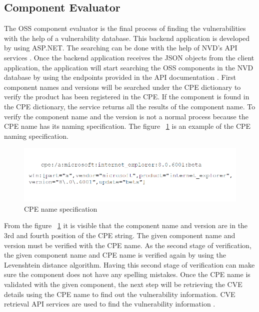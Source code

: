 \subsection{Component Evaluator}
The \acs{OSS} component evaluator is the final process of finding the vulnerabilities with the help of a vulnerability database. This backend application is developed by using ASP.NET. The searching can be done with the help of \acs{NVD}'s API services \cite{NVDApi}. Once the backend application receives the JSON objects from the client application, the application will start searching the OSS components in the \acs{NVD} database by using the endpoints provided in the API documentation \cite{NVDApi}. First component names and versions will be searched under the \acs{CPE} dictionary to verify the product has been registered in the \acs{CPE}. If the component is found in the \acs{CPE} dictionary, the service returns all the results of the component name. To verify the component name and the version is not a normal process because the \acs{CPE} name has its naming specification. The figure ~\ref{fig:cpe_name} is an example of the \acs{CPE} naming specification.
 \begin{figure}[h!]
	\includegraphics[width=16cm]{includes/cpe_name.png}
	\centering
	\caption{CPE name specification}
	\label{fig:cpe_name}
\end{figure}
From the figure ~\ref{fig:cpe_name} it is visible that the component name and version are in the 3rd and fourth position of the \acs{CPE} string. The given component name and version must be verified with the \acs{CPE} name. As the second stage of verification, the given component name and \acs{CPE} name is verified again by using the Levenshtein distance algorithm. Having this second stage of verification can make sure the component does not have any spelling mistakes. Once the \acs{CPE} name is validated with the given component, the next step will be retrieving the \acs{CVE} details using the \acs{CPE} name to find out the vulnerability information. \acs{CVE} retrieval API services are used to find the vulnerability information \cite{NVDApi}. 

